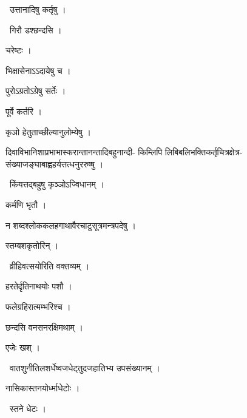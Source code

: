 \documentclass[10pt, openany, oneside]{book}
\begin{document}
\par\noindent\hspace{1.5em}{\vps वा॰}~{\qt उत्तानादिषु कर्तृषु ।}

\par\noindent\hspace{1.5em}{\vps वा॰}~{\qt गिरौ डश्छन्दसि ।}

\noindent चरेष्टः ।

\noindent भिक्षासेनाऽऽदायेषु च ।

\noindent पुरोऽग्रतोऽग्रेषु सर्तेः ।

\noindent पूर्वे कर्तरि ।

\noindent कृञो हेतुताच्छील्यानुलोम्येषु ।

\noindent दिवाविभानिशाप्रभाभास्करान्तानन्तादिबहुनान्दी- किम्लिपि लिबिबलिभक्तिकर्तृचित्रक्षेत्र- संख्याजङ्घाबाह्वहर्यत्तत्धनुररुष्षु ।

\par\noindent\hspace{1.5em}{\vps वा॰}~{\qt किंयत्तद्बहुषु कृञ्ञोऽज्विधानम् ।}

\noindent कर्मणि भृतौ ।

\noindent न शब्दश्लोककलहगाथावैरचाटुसूत्रमन्त्रपदेषु ।

\noindent स्तम्बशकृतोरिन् ।

\par\noindent\hspace{1.5em}{\vps वा॰}~{\qt व्रीहिवत्सयोरिति वक्तव्यम् ।}

\noindent हरतेर्दृतिनाथयोः पशौ ।

\noindent फलेग्रहिरात्मम्भरिश्च ।

\noindent छन्दसि वनसनरक्षिमथाम् ।

\noindent एजेः खश् ।

\par\noindent\hspace{1.5em}{\vps वा॰}~{\qt वातशुनीतिलशर्धेष्वजधेट्तुदजहातिभ्य उपसंख्यानम् ।}

\noindent नासिकास्तनयोर्ध्माधेटोः ।

\par\noindent\hspace{1.5em}{\vps वा॰}~{\qt स्तने धेटः ।}
\end{document}
